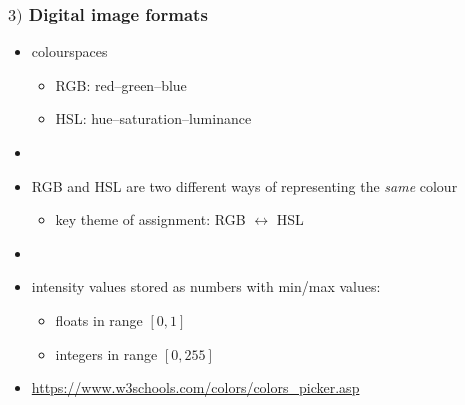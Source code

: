 \documentclass[english,14pt]{beamer}
\begin{document}

\begin{frame}[fragile]

\frametitle{$3)$ Digital image formats}

\begin{itemize}

	\item colourspaces
	\begin{itemize}
		\item RGB: red--green--blue
		\item HSL: hue--saturation--luminance
	\end{itemize}
	\item[]
	\item RGB and HSL are two different ways of representing the \emph{same} colour
	\begin{itemize}
		\item key theme of assignment: RGB $\longleftrightarrow$ HSL
	\end{itemize}
	\item[]
	\item intensity values stored as numbers with min/max values:
	\begin{itemize}
		\item floats in range $[0,1]$
		\item integers in range $[0,255]$
	\end{itemize}
	\item {\small \href{https://www.w3schools.com/colors/colors_picker.asp}{https://www.w3schools.com/colors/colors\_picker.asp}}
\end{itemize}

\end{frame}

\end{document}
